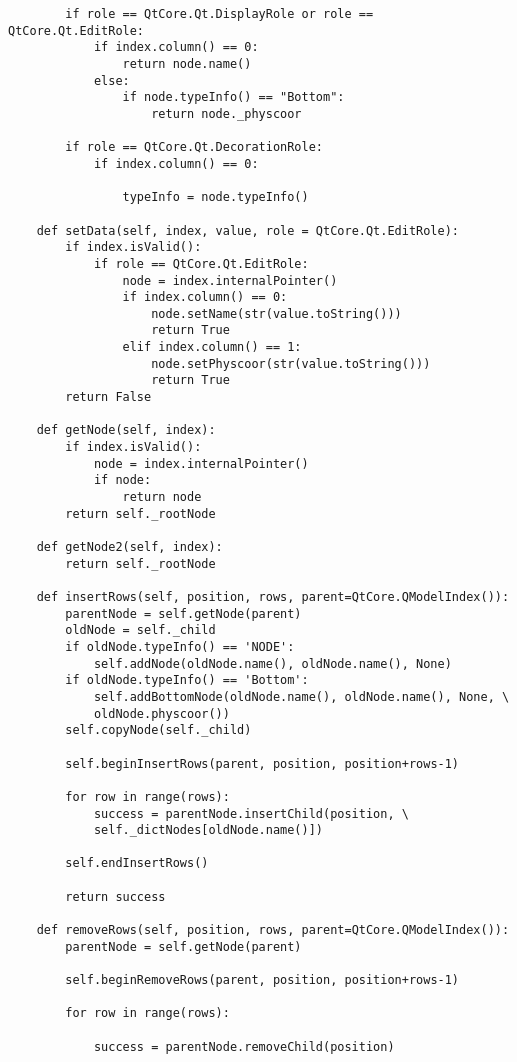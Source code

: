 \begin{verbatim}
        if role == QtCore.Qt.DisplayRole or role == QtCore.Qt.EditRole:
            if index.column() == 0:
                return node.name()
            else:
                if node.typeInfo() == "Bottom":
                    return node._physcoor

        if role == QtCore.Qt.DecorationRole:
            if index.column() == 0:

                typeInfo = node.typeInfo()

    def setData(self, index, value, role = QtCore.Qt.EditRole):
        if index.isValid():
            if role == QtCore.Qt.EditRole:
                node = index.internalPointer()
                if index.column() == 0:
                    node.setName(str(value.toString()))
                    return True
                elif index.column() == 1:
                    node.setPhyscoor(str(value.toString()))
                    return True
        return False

    def getNode(self, index):
        if index.isValid():
            node = index.internalPointer()
            if node:
                return node
        return self._rootNode

    def getNode2(self, index):
        return self._rootNode

    def insertRows(self, position, rows, parent=QtCore.QModelIndex()):
        parentNode = self.getNode(parent)
        oldNode = self._child
        if oldNode.typeInfo() == 'NODE':
            self.addNode(oldNode.name(), oldNode.name(), None)    
        if oldNode.typeInfo() == 'Bottom':
            self.addBottomNode(oldNode.name(), oldNode.name(), None, \
            oldNode.physcoor())
        self.copyNode(self._child)

        self.beginInsertRows(parent, position, position+rows-1)

        for row in range(rows):
            success = parentNode.insertChild(position, \
            self._dictNodes[oldNode.name()])  

        self.endInsertRows()

        return success

    def removeRows(self, position, rows, parent=QtCore.QModelIndex()):
        parentNode = self.getNode(parent)
                
        self.beginRemoveRows(parent, position, position+rows-1)

        for row in range(rows):
            
            success = parentNode.removeChild(position)


\end{verbatim}
